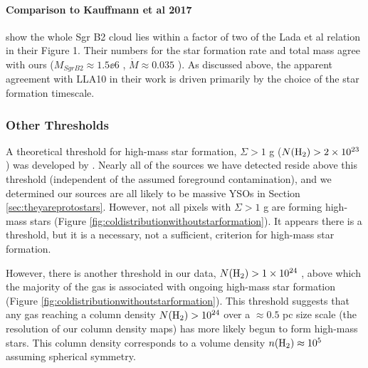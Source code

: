 \documentclass[twocolumn]{aastex61}
\begin{document}


\paragraph{Comparison to Kauffmann et al 2017}
\label{sec:kauffcompare}
\citet{Kauffmann2017c} show the whole Sgr B2 cloud lies within a factor of two
of the Lada et al relation in their Figure 1.  Their numbers for the star
formation rate and total mass agree with ours ($M_{Sgr B2}\approx1.5\ee{6}$
\msun, $\dot{M}\approx 0.035$ \msun \peryr).  As discussed above, the apparent
agreement with LLA10 in their work is driven primarily by the choice of the star
formation timescale.  


\subsubsection{Other Thresholds}
\label{sec:otherthresholds}

A theoretical threshold for high-mass star formation, $\Sigma > 1$ g \persc
($N(\textrm{H}_{2}) > 2\times10^{23}$ \persc) was developed by \citet{Krumholz2008a}.   Nearly
all of the sources we have detected reside above this threshold (independent of
the assumed foreground contamination), and we determined our sources are all
likely to be massive YSOs in Section \ref{sec:theyareprotostars}.
However, not all pixels with $\Sigma > 1$ g \persc are forming high-mass stars
(Figure \ref{fig:coldistributionwithoutstarformation}).  It appears
there is a threshold, but it is a necessary, not a sufficient, criterion
for high-mass star formation.

However, there is another threshold in our data, $N(\textrm{H}_{2})>1\times10^{24}$ \persc,
above which the majority of the gas is associated with ongoing high-mass star
formation (Figure \ref{fig:coldistributionwithoutstarformation}).  This
threshold suggests that any gas reaching a column density $N(\textrm{H}_{2})>10^{24}$
\persc over a $\approx0.5$ pc size scale (the resolution of our column density
maps) has more likely begun to form high-mass stars.  This column
density corresponds to a volume density $n(\textrm{H}_{2})\approx10^5$ \percc assuming
spherical symmetry.
\end{document}

